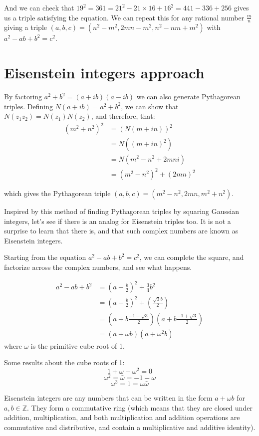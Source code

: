 \documentclass{article}
\begin{document}
And we can check that $19^2 = 361 = 21^2 - 21\times 16 + 16^2 = 441-336+256$ gives us a triple
satisfying the equation. We can repeat this for any rational number $\frac{m}{n}$ giving a triple
$(a,b,c) = (n^2-m^2, 2mn - m^2, n^2-nm+m^2)$ with $a^2 - ab + b^2 = c^2$.

\section{Eisenstein integers approach}

By factoring $a^2 + b^2 = (a+ib)(a-ib)$ we can also generate Pythagorean triples. Defining 
$N(a+ib) = a^2 + b^2$, we can show that $N(z_1 z_2) = N(z_1)N(z_2)$, and therefore, that:
\begin{align*}
	(m^2+n^2)^2 & = (N(m+in))^2 \\
	&= N((m+in)^2) \\
	&= N(m^2-n^2 + 2mni) \\
	&= (m^2-n^2)^2 + (2mn)^2
\end{align*}

which gives the Pythagorean triple $(a,b,c) = (m^2-n^2,2mn,m^2+n^2)$.

Inspired by this method of finding Pythagorean triples by squaring Gaussian integers, let's
see if there is an analog for Eisenstein triples too. It is not a surprise to learn that there is,
and that such complex numbers are known as Eisenstein integers.

Starting from the equation $ a^2 - ab + b^2 = c^2$, we can complete the square, and factorize
across the complex numbers, and see what happens.

\begin{align*}
	a^2 - ab + b^2 &= \left(a-\frac{b}{2}\right)^2 + \frac{3}{4}b^2 \\
	&= \left(a-\frac{b}{2}\right)^2 + \left(\frac{\sqrt{3}b}{2}\right) \\
	&= \left(a + b\frac{-1-\sqrt{3}}{2}\right)\left(a + b\frac{-1+\sqrt{3}}{2}\right) \\
	&= \left(a + \omega b\right) \left(a + \omega^2 b\right)
\end{align*}
where $\omega$ is the primitive cube root of 1.

Some results about the cube roots of 1:
\[ 1 + \omega + \omega^2 = 0 \]
\[ \omega^2 = \bar{\omega} = -1 - \omega\]
\[ \omega^3 = 1 = \omega \bar{\omega} \]

Eisenstein integers are any numbers that can be written in the form $a+\omega b$ for
$a,b \in \mathbb{Z}$. They form a commutative ring (which means that they are closed under addition,
multiplication, and both multiplication and addition operations are commutative and distributive, 
and contain a multiplicative and additive identity).
\end{document}
